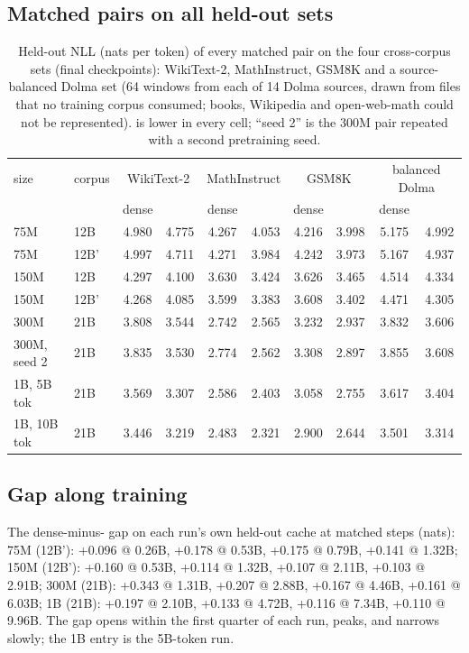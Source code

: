 \subsection{Matched pairs on all held-out sets}
\label{app:pairs}
\begin{table}[h]\centering\footnotesize\setlength{\tabcolsep}{2.5pt}
\begin{tabular}{llcccccccc}\toprule
size & corpus & \multicolumn{2}{c}{WikiText-2} & \multicolumn{2}{c}{MathInstruct} & \multicolumn{2}{c}{GSM8K} & \multicolumn{2}{c}{balanced Dolma} \\
 & & dense & \dagf{} & dense & \dagf{} & dense & \dagf{} & dense & \dagf{} \\\midrule
75M & 12B & 4.980 & 4.775 & 4.267 & 4.053 & 4.216 & 3.998 & 5.175 & 4.992 \\
75M & 12B' & 4.997 & 4.711 & 4.271 & 3.984 & 4.242 & 3.973 & 5.167 & 4.937 \\
150M & 12B & 4.297 & 4.100 & 3.630 & 3.424 & 3.626 & 3.465 & 4.514 & 4.334 \\
150M & 12B' & 4.268 & 4.085 & 3.599 & 3.383 & 3.608 & 3.402 & 4.471 & 4.305 \\
300M & 21B & 3.808 & 3.544 & 2.742 & 2.565 & 3.232 & 2.937 & 3.832 & 3.606 \\
300M, seed 2 & 21B & 3.835 & 3.530 & 2.774 & 2.562 & 3.308 & 2.897 & 3.855 & 3.608 \\
1B, 5B tok & 21B & 3.569 & 3.307 & 2.586 & 2.403 & 3.058 & 2.755 & 3.617 & 3.404 \\
1B, 10B tok & 21B & 3.446 & 3.219 & 2.483 & 2.321 & 2.900 & 2.644 & 3.501 & 3.314 \\
\bottomrule\end{tabular}
\caption{Held-out NLL (nats per token) of every matched pair on the four cross-corpus sets (final checkpoints): WikiText-2, MathInstruct, GSM8K and a source-balanced Dolma set (64 windows from each of 14 Dolma sources, drawn from files that no training corpus consumed; books, Wikipedia and open-web-math could not be represented). \dagf{} is lower in every cell; ``seed 2'' is the 300M pair repeated with a second pretraining seed.}
\label{tab:pairs_all}\end{table}

\subsection{Gap along training}
\label{app:gapcurve}
The dense-minus-\dagf{} gap on each run's own held-out cache at matched steps (nats): 
75M (12B'): +0.096 @ 0.26B, +0.178 @ 0.53B, +0.175 @ 0.79B, +0.141 @ 1.32B; 150M (12B'): +0.160 @ 0.53B, +0.114 @ 1.32B, +0.107 @ 2.11B, +0.103 @ 2.91B; 300M (21B): +0.343 @ 1.31B, +0.207 @ 2.88B, +0.167 @ 4.46B, +0.161 @ 6.03B; 1B (21B): +0.197 @ 2.10B, +0.133 @ 4.72B, +0.116 @ 7.34B, +0.110 @ 9.96B. The gap opens within the first quarter of each run, peaks, and narrows slowly; the 1B entry is the 5B-token run.

